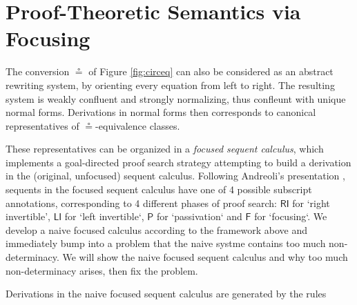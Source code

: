 \documentclass[submission,copyright,creativecommons]{eptcs}
\theoremstyle{definition}
\newcommand{\RI}{\mathsf{RI}}
\newcommand{\LI}{\mathsf{LI}}
\newcommand{\Pass}{\mathsf{P}}
\newcommand{\F}{\mathsf{F}}
\newcommand{\FSkMCC}{\textsf{Free}}
\begin{document}

\section{Proof-Theoretic Semantics via Focusing}

The conversion $\circeq$ of Figure \ref{fig:circeq} can also be considered as an abstract rewriting system, by orienting every equation from left to right. The resulting system is weakly confluent and strongly normalizing, thus confleunt with unique normal forms. Derivations in normal forms then corresponds to canonical representatives of $\circeq$-equivalence classes.

These representatives can be organized in a \emph{focused sequent calculus}, which implements a goal-directed proof search strategy attempting to build a derivation in the (original, unfocused) sequent calculus. Following Andreoli's presentation \cite{andreoli:logic:1992}, sequents in the focused sequent calculus have one of 4 possible subscript annotations, corresponding to 4 different phases of proof search: $\RI$ for `right invertible', $\LI$ for `left invertible`, $\Pass$ for `passivation` and $\F$ for `focusing`.
We develop a naive focused calculus according to the framework above and immediately bump into a problem that the naive systme contains too much non-determinacy.
We will show the naive focused sequent calculus and why too much non-determinacy arises, then fix the problem.

Derivations in the naive focused sequent calculus are generated by the rules
\end{document}

